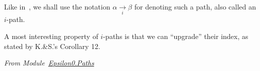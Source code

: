Like in~\cite{KS81}, we shall use the notation $\alpha \xrightarrow[i]{} \beta$ for denoting such a path, also called an $i$-path.














A most interesting property of $i$-paths is that we can ``upgrade'' their index, as stated by K.\&S.'s Corollary 12.


\vspace{4pt}
\noindent
\emph{From
  Module~\href{../theories/html/hydras.Epsilon0.Paths.html}{Epsilon0.Paths}}

